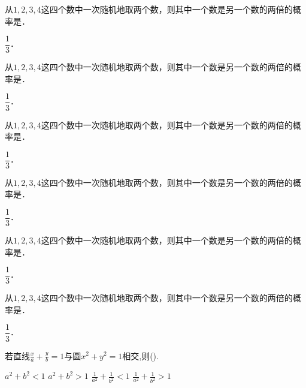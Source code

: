 \documentclass[a4paper,marginl,answers]{BHCexam}
\begin{document}
\maketitle
\xuzhi

\begin{questions}

\tiankong

\question
  从$1,2,3,4$这四个数中一次随机地取两个数，则其中一个数是另一个数的两倍的概率是\underline {\hfill}．

\begin{solution}
	$\dfrac{1}{3}$．
\end{solution}

\question
  从$1,2,3,4$这四个数中一次随机地取两个数，则其中一个数是另一个数的两倍的概率是\underline {\hspace{3cm}}．

\begin{solution}
	$\dfrac{1}{3}$．
\end{solution}

\question
  从$1,2,3,4$这四个数中一次随机地取两个数，则其中一个数是另一个数的两倍的概率是\underline {\hspace{3cm}}．

\begin{solution}
	$\dfrac{1}{3}$．
\end{solution}

\question
  从$1,2,3,4$这四个数中一次随机地取两个数，则其中一个数是另一个数的两倍的概率是\underline {\hspace{3cm}}．

\begin{solution}
	$\dfrac{1}{3}$．
\end{solution}

\question
  从$1,2,3,4$这四个数中一次随机地取两个数，则其中一个数是另一个数的两倍的概率是\underline {\hspace{3cm}}．

\begin{solution}
	$\dfrac{1}{3}$．
\end{solution}

\question
  从$1,2,3,4$这四个数中一次随机地取两个数，则其中一个数是另一个数的两倍的概率是\underline {\hspace{3cm}}．

\begin{solution}
	$\dfrac{1}{3}$．
\end{solution}

\xuanze

\question
  若直线$\frac{x}{a}+\frac{y}{b}=1$与圆$x^2+y^2=1$相交,则(\quad).
\begin{oneparchoices}
  \choice $a^2+b^2<1$
  \choice $a^2+b^2>1$
  \choice $\frac{1}{a^2}+\frac{1}{b^2}<1$
  \choice $\frac{1}{a^2}+\frac{1}{b^2}>1$
\end{oneparchoices}


\end{questions}
\end{document}
